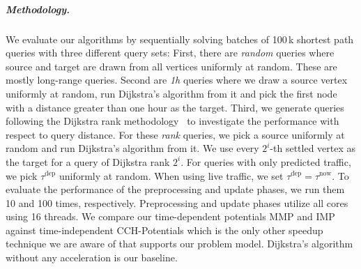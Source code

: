 \documentclass[a4paper,UKenglish,cleveref, autoref, thm-restate,anonymous]{lipics-v2021}
\newcommand*{\tdep}{\tau^{\operatorname{dep}}}
\newcommand*{\tnow}{\tau^{\operatorname{now}}}
\begin{document}

\subparagraph{Methodology.}
We evaluate our algorithms by sequentially solving batches of 100\,k shortest path queries with three different query sets:
First, there are \emph{random} queries where source and target are drawn from all vertices uniformly at random.
These are mostly long-range queries.
Second are \emph{1h} queries where we draw a source vertex uniformly at random, run Dijkstra's algorithm from it and pick the first node with a distance greater than one hour as the target.
Third, we generate queries following the Dijkstra rank methodology~\cite{ss-hhhes-05} to investigate the performance with respect to query distance.
For these \emph{rank} queries, we pick a source uniformly at random and run Dijkstra's algorithm from it.
We use every $2^{i}$-th settled vertex as the target for a query of Dijkstra rank $2^i$.
For queries with only predicted traffic, we pick $\tdep$ uniformly at random.
When using live traffic, we set $\tdep = \tnow$.
To evaluate the performance of the preprocessing and update phases, we run them 10 and 100 times, respectively.
Preprocessing and update phases utilize all cores using 16 threads.
%
We compare our time-dependent potentials MMP and IMP against time-independent CCH-Potentials which is the only other speedup technique we are aware of that supports our problem model.
Dijkstra's algorithm without any acceleration is our baseline.
\end{document}
